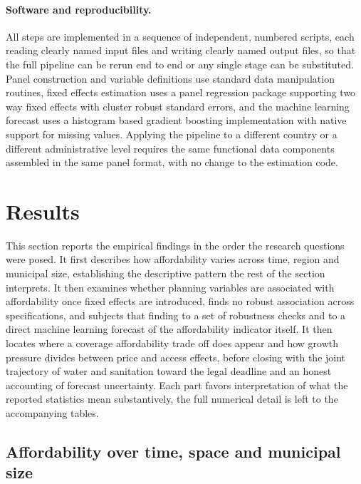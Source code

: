 \documentclass[pdflatex,sn-mathphys-num]{sn-jnl}%
\theoremstyle{thmstyleone}%
\theoremstyle{thmstyletwo}%
\theoremstyle{thmstylethree}%
\begin{document}
\paragraph{Software and reproducibility.}

All steps are implemented in a sequence of independent, numbered scripts, each reading clearly named input files and writing clearly named output files, so that the full pipeline can be rerun end to end or any single stage can be substituted. Panel construction and variable definitions use standard data manipulation routines, fixed effects estimation uses a panel regression package supporting two way fixed effects with cluster robust standard errors, and the machine learning forecast uses a histogram based gradient boosting implementation with native support for missing values. Applying the pipeline to a different country or a different administrative level requires the same functional data components assembled in the same panel format, with no change to the estimation code.

\section{Results}\label{sec2}

This section reports the empirical findings in the order the research questions were posed. It first describes how affordability varies across time, region and municipal size, establishing the descriptive pattern the rest of the section interprets. It then examines whether planning variables are associated with affordability once fixed effects are introduced, finds no robust association across specifications, and subjects that finding to a set of robustness checks and to a direct machine learning forecast of the affordability indicator itself. It then locates where a coverage affordability trade off does appear and how growth pressure divides between price and access effects, before closing with the joint trajectory of water and sanitation toward the legal deadline and an honest accounting of forecast uncertainty. Each part favors interpretation of what the reported statistics mean substantively, the full numerical detail is left to the accompanying tables.

\subsection{Affordability over time, space and municipal size}\label{subsec_resultados1}
\end{document}
